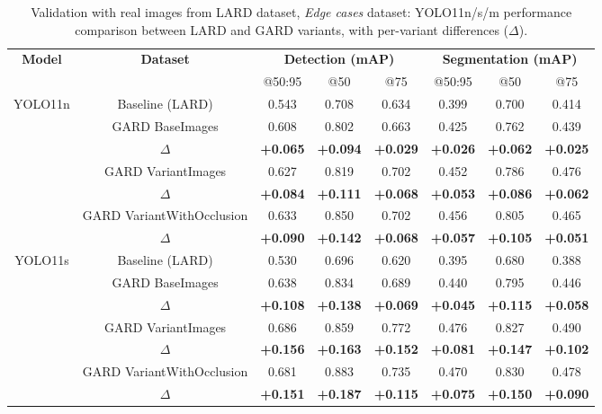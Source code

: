\begin{table}[htbp]
\centering
\small
\setlength{\tabcolsep}{4pt}
\renewcommand{\arraystretch}{1.2}
  \caption{Validation with real images from LARD dataset, \emph{Edge cases} dataset: YOLO11n/s/m performance comparison between LARD and GARD variants, with per-variant differences ($\Delta$).}
  \label{tab:edge_cases_results}

\begin{tabular}{|c|c|ccc|ccc|}
\hline
\multirow{2}{*}{\textbf{Model}} &
\multirow{2}{*}{\textbf{Dataset}} &
\multicolumn{3}{c|}{\textbf{Detection (mAP)}} &
\multicolumn{3}{c|}{\textbf{Segmentation (mAP)}} \\
& & @50:95 & @50 & @75 & @50:95 & @50 & @75 \\

\hline
\multirow{6}{*}{YOLO11n}
& Baseline (LARD) & 0.543 & 0.708 & 0.634 & 0.399 & 0.700 & 0.414 \\
& GARD BaseImages & 0.608 & 0.802 & 0.663 & 0.425 & 0.762 & 0.439 \\
& $\Delta$ & \textbf{+0.065} & \textbf{+0.094} & \textbf{+0.029} & \textbf{+0.026} & \textbf{+0.062} & \textbf{+0.025} \\
& GARD VariantImages & 0.627 & 0.819 & 0.702 & 0.452 & 0.786 & 0.476 \\
& $\Delta$ & \textbf{+0.084} & \textbf{+0.111} & \textbf{+0.068} & \textbf{+0.053} & \textbf{+0.086} & \textbf{+0.062} \\
& GARD VariantWithOcclusion & 0.633 & 0.850 & 0.702 & 0.456 & 0.805 & 0.465 \\
& $\Delta$ & \textbf{+0.090} & \textbf{+0.142} & \textbf{+0.068} & \textbf{+0.057} & \textbf{+0.105} & \textbf{+0.051} \\
\hline

\hline
\multirow{6}{*}{YOLO11s}
& Baseline (LARD) & 0.530 & 0.696 & 0.620 & 0.395 & 0.680 & 0.388 \\
& GARD BaseImages & 0.638 & 0.834 & 0.689 & 0.440 & 0.795 & 0.446 \\
& $\Delta$ & \textbf{+0.108} & \textbf{+0.138} & \textbf{+0.069} & \textbf{+0.045} & \textbf{+0.115} & \textbf{+0.058} \\
& GARD VariantImages & 0.686 & 0.859 & 0.772 & 0.476 & 0.827 & 0.490 \\
& $\Delta$ & \textbf{+0.156} & \textbf{+0.163} & \textbf{+0.152} & \textbf{+0.081} & \textbf{+0.147} & \textbf{+0.102} \\
& GARD VariantWithOcclusion & 0.681 & 0.883 & 0.735 & 0.470 & 0.830 & 0.478 \\
& $\Delta$ & \textbf{+0.151} & \textbf{+0.187} & \textbf{+0.115} & \textbf{+0.075} & \textbf{+0.150} & \textbf{+0.090} \\
\hline


\end{tabular}
\end{table}
